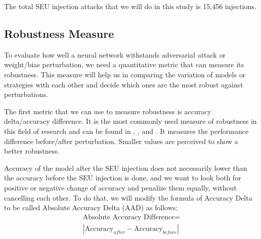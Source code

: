 

The total SEU injection attacks that we will do in this study is 15,456 injections.

\subsection{Robustness Measure}

To evaluate how well a neural network withstands adversarial attack or weight/bias perturbation, we need a quantitative metric that can measure its robustness. This measure will help us in comparing the variation of models or strategies with each other and decide which ones are the most robust against perturbations.

The first metric that we can use to measure robustness is accuracy delta/accuracy difference. It is the most commonly used measure of robustness in this field of research and can be found in \cite{dennispoperobustcnn}, \cite{feng2024attackingbayesadversarialrobustness}, and \cite{pang2021evaluatingrobustnessbayesianneural}.  It measures the performance difference before/after perturbation. Smaller values are perceived to show a better robustness. 

Accuracy of the model after the SEU injection does not necessarily lower than the accuracy before the SEU injection is done, and we want to look both for positive or negative change of accuracy and penalize them equally, without cancelling each other. To do that, we will modify the formula of Accuracy Delta to be called Absolute Accuracy Delta (AAD) as follows:
\begin{multline} \label{eq:absaccdiff}
\text{Absolute Accuracy Difference} = \\
\left|\text{Accuracy}_{after} - \text{Accuracy}_{before} \right|
\end{multline}

